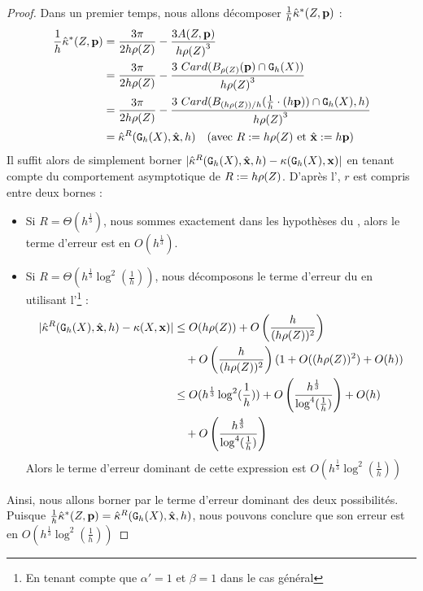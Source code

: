 \begin{proof}
  Dans un premier temps, nous allons décomposer
  $\frac{1}{h}\hat{\kappa}^{*}(Z,\mathbf{p})$ :
  \begin{align}
    \frac{1}{h}\hat{\kappa}^{*}(Z,\mathbf{p}) &= \frac{3\pi}{2 h\rho(Z)} - \frac{3 A(Z,\mathbf{p})}{h{\rho(Z)}^3} \\
    &= \frac{3\pi}{2 h\rho(Z)} - \frac{3~ Card(B_{\rho(Z)}(\mathbf{p}) \cap \mathtt{G}_{h}(X))}{h{\rho(Z)}^3} \\
    &= \frac{3\pi}{2 h\rho(Z)} - \frac{3~ Card( B_{(h\rho(Z))/h}(\frac{1}{h} \cdot (h\mathbf{p})) \cap \mathtt{G}_{h}(X), h)}{h{\rho(Z)}^3} \\
    &= \hat{\kappa}^{R}(\mathtt{G}_{h}(X),\hat{\mathbf{x}},h)\quad \text{(avec $R := h\rho(Z)$ et $\hat{\mathbf{x}} := h\mathbf{p}$)}
  \end{align}
  Il suffit alors de simplement borner $| \hat{\kappa}^{R}(\mathtt{G}_{h}(X),\hat{\mathbf{x}},h) -
  \kappa(\mathtt{G}_{h}(X),\mathbf{x}) |$ en tenant compte du comportement asymptotique de $R :=
  h\rho(Z)$. D'après l', $r$ est
  compris entre deux bornes :
  \begin{itemize}
    \item Si $R = \Theta(h^{\frac{1}{3}})$, nous sommes exactement dans les
    hypothèses du , alors le terme d'erreur
    est en $O( h^\frac{1}{3} )$.
    \item Si $R = \Theta(h^{\frac{1}{3}} \log^2 \left(\frac{1}{h}\right))$, nous
    décomposons le terme d'erreur du  en
    utilisant l'\footnote{En
    tenant compte que $\alpha' = 1$ et $\beta = 1$ dans le cas général} :
    \begin{align}
      |\hat{\kappa}^{R}(\mathtt{G}_{h}(X),\hat{\mathbf{x}},h) - \kappa(X,\mathbf{x})| & \le O(h\rho(Z)) + O\left(\frac{h}{(h\rho(Z))^{2}}\right) \nonumber\\
      &\quad + O\left(\frac{h}{(h\rho(Z))^{2}}\right)( 1 + O((h\rho(Z))^2) + O(h)) \\
      & \le O(h^{\frac{1}{3}} \log^2 (\frac{1}{h})) + O\left(\frac{h^\frac{1}{3}}{\log^4 (\frac{1}{h})}\right) + O( h ) \nonumber\\
      &\quad + O\left(\frac{h^\frac{4}{3}}{\log^4 (\frac{1}{h})}\right)
    \end{align}
    Alors le terme d'erreur dominant de cette expression est $O(h^{\frac{1}{3}}
    \log^2 (\frac{1}{h}))$
  \end{itemize}
  Ainsi, nous allons borner par le terme d'erreur dominant des deux
  possibilités. Puisque
  $\frac{1}{h}\hat{\kappa}^{*}(Z,\mathbf{p})=\hat{\kappa}^{R}(\mathtt{G}_{h}(X),\hat{\mathbf{x}},h)$, nous pouvons
  conclure que son erreur est en $O(h^{\frac{1}{3}} \log^2 (\frac{1}{h}))$
\end{proof}
